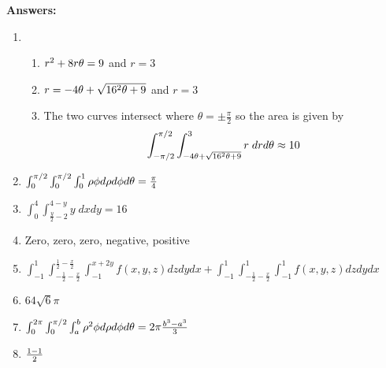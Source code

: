 \documentclass[12pt]{article}
\let\sin\relax\DeclareMathOperator{\sin}{\mathsf{sin}}
\let\cos\relax\DeclareMathOperator{\cos}{\mathsf{cos}}
\begin{document}
{\bf Answers:}
\begin{enumerate}
\item\begin{enumerate}
\item $r^2+8r\cos{\theta}=9$ and $r=3$
\item $r=-4\cos{\theta}+\sqrt{16\cos^2{\theta}+9}$ and $r=3$
\item The two curves intersect where $\theta=\pm\frac{\pi}{2}$ so the
area is given by \[\int_{-\pi/2}^{\pi/2}\int
_{-4\cos{\theta}+\sqrt{16\cos^2{\theta}+9}}^3r\;drd\theta\approx 10\]
\end{enumerate}
\item $\int_0^{\pi/2}\int_0^{\pi/2}\int_0^1\rho\sin{\phi}
d\rho d\phi d\theta=\frac{\pi}{4}$
\item $\int_0^4\int_{\frac{y}{2}-2}^{4-y}y\;dxdy=16$
\item Zero, zero, zero, negative, positive
\item $\int_{-1}^1\int_{-\frac{1}{2}-\frac{x}{2}}
^{\frac{1}{2}-\frac{x}{2}}\int_{-1}^{x+2y}
f\left(x,y,z\right)dzdydx
+\int_{-1}^1\int_{-\frac{1}{2}-\frac{x}{2}}
^1\int_{-1}^1
f\left(x,y,z\right)dzdydx$
\item $64\sqrt{6}\pi$
\item $\int_0^{2\pi}\int_0^{\pi/2}\int_a^b\rho^2\sin{\phi}
d\rho d\phi d\theta=2\pi\frac{b^3-a^3}{3}$
\item $\frac{1-\cos{1}}{2}$
\end{enumerate}
\end{document}
